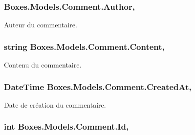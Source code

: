 \subsubsection[{\texorpdfstring{Author}{Author}}]{ Boxes.\+Models.\+Comment.\+Author\hspace{0.3cm}{\ttfamily [get]}, {\ttfamily [set]}}\hypertarget{class_boxes_1_1_models_1_1_comment_a5508a7fed1faf23c69774ee9da265b42}{}\label{class_boxes_1_1_models_1_1_comment_a5508a7fed1faf23c69774ee9da265b42}


Auteur du commentaire. 

\subsubsection[{\texorpdfstring{Content}{Content}}]{\setlength{\rightskip}{0pt plus 5cm}string Boxes.\+Models.\+Comment.\+Content\hspace{0.3cm}{\ttfamily [get]}, {\ttfamily [set]}}\hypertarget{class_boxes_1_1_models_1_1_comment_a9c08fa4175838cfcaedefaa9f56f81eb}{}\label{class_boxes_1_1_models_1_1_comment_a9c08fa4175838cfcaedefaa9f56f81eb}


Contenu du commentaire. 

\subsubsection[{\texorpdfstring{Created\+At}{CreatedAt}}]{\setlength{\rightskip}{0pt plus 5cm}Date\+Time Boxes.\+Models.\+Comment.\+Created\+At\hspace{0.3cm}{\ttfamily [get]}, {\ttfamily [set]}}\hypertarget{class_boxes_1_1_models_1_1_comment_aebb56ea4463befd4223a86ab70afb088}{}\label{class_boxes_1_1_models_1_1_comment_aebb56ea4463befd4223a86ab70afb088}


Date de création du commentaire. 

\subsubsection[{\texorpdfstring{Id}{Id}}]{\setlength{\rightskip}{0pt plus 5cm}int Boxes.\+Models.\+Comment.\+Id\hspace{0.3cm}{\ttfamily [get]}, {\ttfamily [set]}}\hypertarget{class_boxes_1_1_models_1_1_comment_a826b20acd7535f6ca9d87dfb02bb015a}{}\label{class_boxes_1_1_models_1_1_comment_a826b20acd7535f6ca9d87dfb02bb015a}


